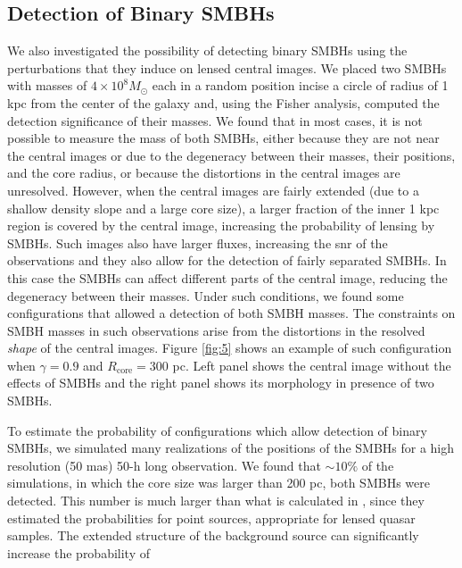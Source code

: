 \documentclass[chicago]{emulateapj}
\begin{document}
\subsection{Detection of Binary SMBHs}
We also investigated the possibility of detecting binary SMBHs using the perturbations that they induce on lensed central images. 
We placed two SMBHs with masses of $4\times10^8 M_{\odot}$ each in a random position incise a circle of radius of 1 kpc from the center of the galaxy and, using the Fisher analysis, computed the detection significance of their masses. 
We found that in most cases, it is not possible to measure the mass of both SMBHs, either because they are not near the central images or due to the degeneracy between their masses, their positions, and the core radius, or because the distortions in the central images are unresolved.
However, when the central images are fairly extended (due to a shallow density slope and a large core size), a larger fraction of the inner 1 kpc region is covered by the central image, increasing the probability of lensing by SMBHs. Such images also have larger fluxes, increasing the snr of the observations and they also allow for the detection of fairly separated SMBHs. In this case the SMBHs can affect different parts of the central image, reducing the degeneracy between their masses.
Under such conditions, we found some configurations that allowed a detection of both SMBH masses. The constraints on SMBH masses in such observations arise from the distortions in the resolved \emph{shape} of the central images. Figure \ref{fig:5} shows an example of such configuration when $\gamma = 0.9$ and $R_{\mathrm{core}}=300$ pc. Left panel shows the central image without the effects of SMBHs and the right panel shows its morphology in presence of two SMBHs. 




To estimate the probability of configurations which allow detection of binary SMBHs, we simulated many realizations of the positions of the SMBHs for a high resolution (50 mas) 50-h long observation. 
We found that $\sim10\%$ of the simulations, in which the core size was larger than 200 pc, both SMBHs were detected. 
This number is much larger than what is calculated in \citet{Li:12}, since they estimated  the probabilities for point sources, appropriate for lensed quasar samples. The extended structure of the background source can significantly increase the probability of 
\end{document}
